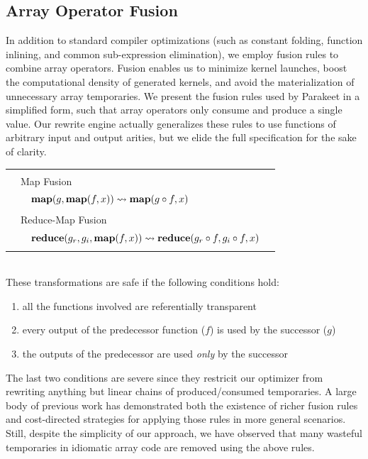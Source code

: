 \documentclass[preprint]{sigplanconf}
\begin{document}
\subsection{Array Operator Fusion}
In addition to standard compiler optimizations (such as constant folding, function inlining, and common sub-expression elimination), 
we employ fusion rules\cite{Jones01} to combine array operators. Fusion enables us to minimize kernel launches, boost the computational density of generated kernels, and
avoid the materialization of unnecessary array temporaries. 
We present the fusion rules used by Parakeet in a simplified form, such that array operators only consume and produce a single value. Our rewrite engine actually generalizes these rules to use functions of arbitrary input and output arities, but we elide the full specification for the sake of clarity. 
\\[5pt]
\begin{tabular}{|m{0.001cm} m{0.05cm} p{6.75cm} p{0.05cm} |}
  \hline 
  & &  & \\
  & \multicolumn{2}{l}{\large{Map Fusion} }  &  \\[2.5pt]
  & & $\mbox{\textbf{map}}(g, \mbox{\textbf{map}}(f, x)) \leadsto \mbox{\textbf{map}}(g \circ f, x)$ & \\
  & & & \\
  & \multicolumn{2}{l}{\large{Reduce-Map Fusion} }  & \\[2.5pt]
  & & $\mbox{\textbf{reduce}}(g_r, g_{i}, \mbox{\textbf{map}}(f, x)) \leadsto \mbox{\textbf{reduce}}(g_r \circ f, g_{i} \circ f, x)$ & \\
  & & & \\
  \hline
\end{tabular}\\[4pt]
These transformations are safe if the following conditions hold: 
\begin{enumerate}
\item all the functions involved are referentially transparent
\item every output of the predecessor function ($f$) is used by the successor ($g$)
\item the outputs of the predecessor are used \textit{only} by the successor 
\end{enumerate}
The last two conditions are severe since they restricit our optimizer from rewriting anything but linear chains of produced/consumed temporaries. A large body of previous work\cite{Ald01} has demonstrated  both the existence of richer fusion rules and cost-directed strategies for applying those rules in more general scenarios. Still, despite the simplicity of our approach, we have observed that many wasteful temporaries in idiomatic array code are removed using the above rules. 
\end{document}
